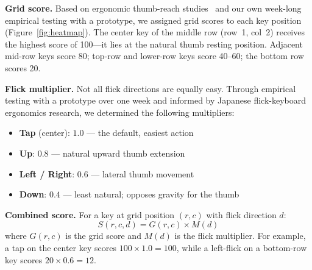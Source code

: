 \documentclass[10pt,twocolumn,a4paper]{article}
\begin{document}
\textbf{Grid score.}
Based on ergonomic thumb-reach studies~\cite{bergstrom2014,karlson2006} and our own week-long empirical testing with a prototype, we assigned grid scores to each key position (Figure~\ref{fig:heatmap}).
The center key of the middle row (row~1, col~2) receives the highest score of 100---it lies at the natural thumb resting position.
Adjacent mid-row keys score 80; top-row and lower-row keys score 40--60; the bottom row scores 20.

\textbf{Flick multiplier.}
Not all flick directions are equally easy.
Through empirical testing with a prototype over one week and informed by Japanese flick-keyboard ergonomics research, we determined the following multipliers:

\begin{itemize}
  \item \textbf{Tap} (center): $1.0$ --- the default, easiest action
  \item \textbf{Up}: $0.8$ --- natural upward thumb extension
  \item \textbf{Left / Right}: $0.6$ --- lateral thumb movement
  \item \textbf{Down}: $0.4$ --- least natural; opposes gravity for the thumb
\end{itemize}

\textbf{Combined score.}
For a key at grid position $(r, c)$ with flick direction $d$:
\begin{equation}
  S(r, c, d) = G(r, c) \times M(d)
  \label{eq:score}
\end{equation}
where $G(r,c)$ is the grid score and $M(d)$ is the flick multiplier.
For example, a tap on the center key scores $100 \times 1.0 = 100$, while a left-flick on a bottom-row key scores $20 \times 0.6 = 12$.
\end{document}
